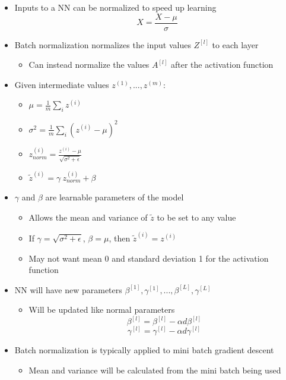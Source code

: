 \documentclass[12pt, letterpaper]{article}
\begin{document}
    \begin{itemize}
        \item Inputs to a NN can be normalized to speed up learning
        $$X=\frac{X-\mu}{\sigma}$$
        \item Batch normalization normalizes the input values $Z^{[l]}$ to each layer
        \begin{itemize}
            \item Can instead normalize the values $A^{[l]}$ after the activation function 
        \end{itemize}
        \item Given intermediate values $z^{(1)},...,z^{(m)}$:
        \begin{itemize}
            \item[] $\mu=\frac{1}{m}\sum_iz^{(i)}$
            \item[] $\sigma^2=\frac{1}{m}\sum_i(z^{(i)}-\mu)^2$
            \item[] $z^{(i)}_{norm}=\frac{z^{(i)}-\mu}{\sqrt{\sigma^2+\epsilon}}$
            \item[] $\tilde{z}^{(i)}=\gamma~z_{norm}^{(i)}+\beta$
        \end{itemize}
        \item $\gamma$ and $\beta$ are learnable parameters of the model
        \begin{itemize}
            \item Allows the mean and variance of $\tilde{z}$ to be set to any value
            \item If $\gamma=\sqrt{\sigma^2+\epsilon}$, $\beta=\mu$, then $\tilde{z}^{(i)}=z^{(i)}$
            \item May not want mean 0 and standard deviation 1 for the activation function
        \end{itemize}
        \item NN will have new parameters $\beta^{[1]},\gamma^{[1]},...,\beta^{[L]},\gamma^{[L]}$
        \begin{itemize}
            \item Will be updated like normal parameters
            $$\beta^{[l]}=\beta^{[l]}-\alpha d\beta^{[l]}$$
            $$\gamma^{[l]}=\gamma^{[l]}-\alpha d\gamma^{[l]}$$
        \end{itemize}
        \item Batch normalization is typically applied to mini batch gradient descent
        \begin{itemize}
            \item Mean and variance will be calculated from the mini batch being used 

\end{itemize}
\end{itemize}
\end{document}
